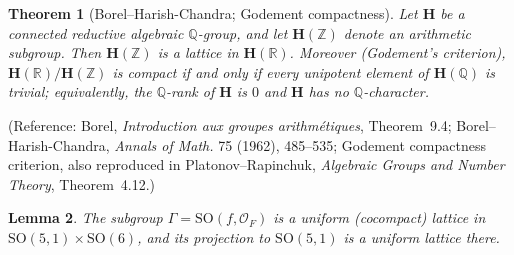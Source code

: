 \documentclass[12pt]{article}
\newtheorem{theorem}{Theorem}
\newtheorem{lemma}[theorem]{Lemma}
\theoremstyle{definition}
\begin{document}
\begin{theorem}[Borel--Harish-Chandra; Godement compactness]\label{thm:BHC}
Let $\mathbf{H}$ be a connected reductive algebraic $\mathbb{Q}$-group, and let $\mathbf{H}(\mathbb{Z})$ denote an arithmetic subgroup. Then $\mathbf{H}(\mathbb{Z})$ is a lattice in $\mathbf{H}(\mathbb{R})$. Moreover (Godement's criterion), $\mathbf{H}(\mathbb{R})/\mathbf{H}(\mathbb{Z})$ is compact if and only if every unipotent element of $\mathbf{H}(\mathbb{Q})$ is trivial; equivalently, the $\mathbb{Q}$-rank of $\mathbf{H}$ is $0$ and $\mathbf{H}$ has no $\mathbb{Q}$-character.
\end{theorem}

(Reference: Borel, \emph{Introduction aux groupes arithm\'etiques}, Theorem~9.4; Borel--Harish-Chandra, \emph{Annals of Math.} 75 (1962), 485--535; Godement compactness criterion, also reproduced in Platonov--Rapinchuk, \emph{Algebraic Groups and Number Theory}, Theorem~4.12.)

\begin{lemma}\label{lem:cocompact}
The subgroup $\Gamma=\mathrm{SO}(f,\mathcal{O}_F)$ is a uniform (cocompact) lattice in $\mathrm{SO}(5,1)\times\mathrm{SO}(6)$, and its projection to $\mathrm{SO}(5,1)$ is a uniform lattice there.
\end{lemma}
\end{document}
